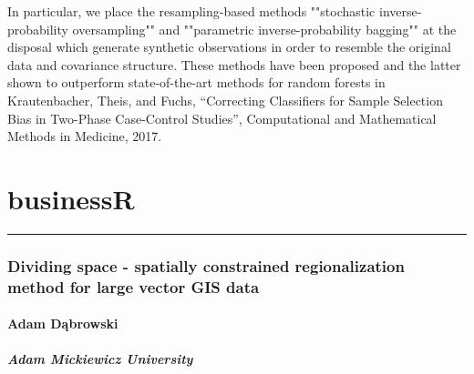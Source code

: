 \documentclass [12pt]{article}
\begin{document}
In particular, we place the resampling-based methods ""stochastic inverse-probability oversampling"" and ""parametric inverse-probability bagging"" at the disposal which generate synthetic observations in order to resemble the original data and covariance structure. These methods have been proposed and the latter shown to outperform state-of-the-art methods for random forests in Krautenbacher, Theis, and Fuchs, “Correcting Classifiers for Sample Selection Bias in Two-Phase Case-Control Studies”, Computational and Mathematical Methods in Medicine, 2017.
\newpage
{}
\part{businessR}

\noindent\rule{\textwidth}{1pt}
\section{Dividing space - spatially constrained regionalization method for large vector GIS data}
\subsection*{Adam Dąbrowski}
\subsubsection*{Adam Mickiewicz University}
\end{document}
